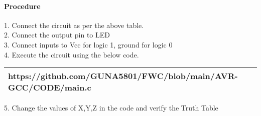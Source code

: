 \documentclass[journal,12pt,two column]{IEEEtran}
\begin{document}
    \paragraph{Procedure}
    
    1. Connect the circuit as per the above table.\\
    2. Connect the output pin to LED\\
    3. Connect inputs to Vcc for logic 1, ground for logic 0\\
    4. Execute the circuit using the below code.\\
   
\begin{tabularx}{0.6\textwidth} { 
  | >{\centering\arraybackslash}X |}
  \hline
  https://github.com/GUNA5801/FWC/blob/main/AVR-GCC/CODE/main.c\\
  \hline
\end{tabularx}
   
5. Change the values of X,Y,Z in the code and verify the Truth Table\\

\end{document}
